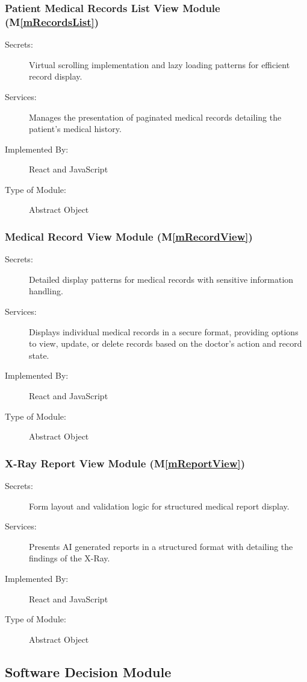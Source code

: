 \documentclass[12pt, titlepage]{article}
\newcommand{\mref}[1]{M\ref{#1}}
\begin{document}
\subsubsection{Patient Medical Records List View Module (\mref{mRecordsList})}
\begin{description}
\item[Secrets:] Virtual scrolling implementation and lazy loading patterns for efficient record display.
\item[Services:] Manages the presentation of paginated medical records detailing the patient's medical history.
\item[Implemented By:] React and JavaScript
\item[Type of Module:] Abstract Object
\end{description}

\subsubsection{Medical Record View Module (\mref{mRecordView})}
\begin{description}
\item[Secrets:] Detailed display patterns for medical records with sensitive information handling.
\item[Services:] Displays individual medical records in a secure format, providing options to view, update, or delete records based on the doctor's action and record state.
\item[Implemented By:] React and JavaScript
\item[Type of Module:] Abstract Object
\end{description}

\subsubsection{X-Ray Report View Module (\mref{mReportView})}
\begin{description}
\item[Secrets:] Form layout and validation logic for structured medical report display.
\item[Services:] Presents AI generated reports in a structured format with detailing the findings of the X-Ray.
\item[Implemented By:] React and JavaScript
\item[Type of Module:] Abstract Object
\end{description}


\subsection{Software Decision Module}
\end{document}
